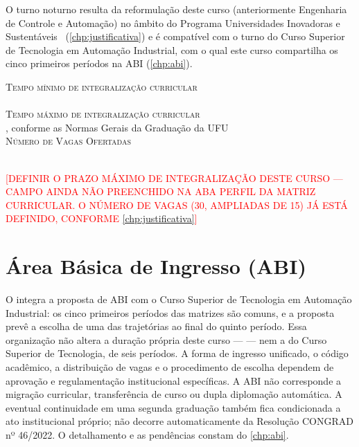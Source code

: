 \begin{center}
O turno noturno resulta da reformulação deste curso (anteriormente Engenharia de Controle e Automação) no âmbito do Programa Universidades Inovadoras e Sustentáveis~\cite{programa_universidades_inovadoras_sustentaveis} (\autoref{chp:justificativa}) e é compatível com o turno do Curso Superior de Tecnologia em Automação Industrial, com o qual este curso compartilha os cinco primeiros períodos na ABI (\autoref{chp:abi}).

\parbox{0.8\textwidth}{
    \textsc{\small \textcolor{AzulClaro}{Tempo mínimo de integralização curricular}} \\ \hspace*{15mm} \textbf{\ppctempominimo}\\
    \textsc{\small \textcolor{AzulClaro}{Tempo máximo de integralização curricular}} \\ \hspace*{15mm} \textbf{\ppctempomaximo}, conforme as Normas Gerais da Graduação da UFU~\cite{ufu_congrad_46_2022}\\
    \textsc{\small \textcolor{AzulClaro}{Número de Vagas Ofertadas}} \\ \hspace*{15mm} \textbf{\ppcvagasofertadas}\\
}

\textcolor{red}{[DEFINIR O PRAZO MÁXIMO DE INTEGRALIZAÇÃO DESTE CURSO — CAMPO AINDA NÃO PREENCHIDO NA ABA PERFIL DA MATRIZ CURRICULAR. O NÚMERO DE VAGAS (30, AMPLIADAS DE 15) JÁ ESTÁ DEFINIDO, CONFORME \autoref{chp:justificativa}]}
\end{center}

\section*{Área Básica de Ingresso (ABI)}

O \ppccurso integra a proposta de ABI com o Curso Superior de Tecnologia em Automação Industrial: os cinco primeiros períodos das matrizes são comuns, e a proposta prevê a escolha de uma das trajetórias ao final do quinto período. Essa organização não altera a duração própria deste curso — \textbf{\ppctempominimo} — nem a do Curso Superior de Tecnologia, de seis períodos. A forma de ingresso unificado, o código acadêmico, a distribuição de vagas e o procedimento de escolha dependem de aprovação e regulamentação institucional específicas. A ABI não corresponde a migração curricular, transferência de curso ou dupla diplomação automática. A eventual continuidade em uma segunda graduação também fica condicionada a ato institucional próprio; não decorre automaticamente da Resolução CONGRAD nº 46/2022. O detalhamento e as pendências constam do \autoref{chp:abi}.

